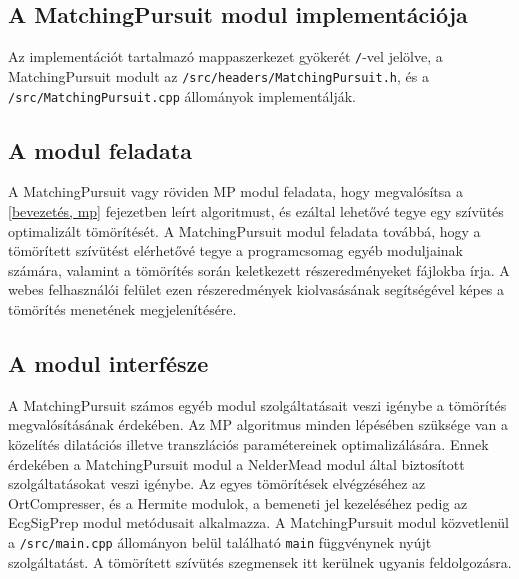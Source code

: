 \documentclass[oneside,titlepage,12pt,a4paper]{report}
\begin{document}

\subsection{A MatchingPursuit modul implementációja}

Az implementációt tartalmazó mappaszerkezet gyökerét \texttt{/}-vel jelölve, a MatchingPursuit modult  az \texttt{/src/headers/MatchingPursuit.h}, és a \texttt{/src/MatchingPursuit.cpp} állományok implementálják.

\subsection*{A modul feladata}

\par A MatchingPursuit vagy röviden MP modul feladata, hogy megvalósítsa a \ref{bevezetés, mp} fejezetben leírt algoritmust, és ezáltal lehetővé tegye egy szívütés optimalizált tömörítését. A MatchingPursuit modul feladata továbbá, hogy a tömörített szívütést elérhetővé tegye a programcsomag egyéb moduljainak számára, valamint a tömörítés során keletkezett részeredményeket fájlokba írja. A webes felhasználói felület ezen részeredmények kiolvasásának segítségével képes a tömörítés menetének megjelenítésére. 

\subsection*{A modul interfésze}

\par A MatchingPursuit számos egyéb modul szolgáltatásait veszi igénybe a tömörítés megvalósításának érdekében. Az MP algoritmus minden lépésében szüksége van a közelítés dilatációs illetve transzlációs paramétereinek optimalizálására. Ennek érdekében a MatchingPursuit modul a NelderMead modul által biztosított szolgáltatásokat veszi igénybe. Az egyes tömörítések elvégzéséhez az OrtCompresser, és a Hermite modulok, a bemeneti jel kezeléséhez pedig az EcgSigPrep modul metódusait alkalmazza. A MatchingPursuit modul közvetlenül a \texttt{/src/main.cpp} állományon belül található \texttt{main} függvénynek nyújt szolgáltatást. A tömörített szívütés szegmensek itt kerülnek ugyanis feldolgozásra. 
\end{document}
